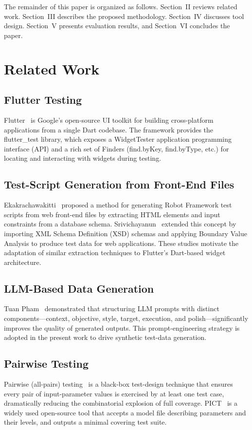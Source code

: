 \documentclass[conference]{IEEEtran}
\renewcommand{\texttt}[1]{\textnormal{#1}}
\begin{document}
The remainder of this paper is organized as follows. Section~II reviews
related work. Section~III describes the proposed methodology. Section~IV
discusses tool design. Section~V presents evaluation results, and
Section~VI concludes the paper.

\section{Related Work}

\subsection{Flutter Testing}
Flutter~\cite{b1} is Google's open-source UI toolkit for building
cross-platform applications from a single Dart codebase. The framework
provides the \texttt{flutter\_test} library, which exposes a
\texttt{WidgetTester} application programming interface (API) and a rich set of Finders (\texttt{find.byKey},
\texttt{find.byType}, etc.) for locating and interacting with widgets during
testing.

\subsection{Test-Script Generation from Front-End Files}
Ekakrachawakitti~\cite{b2} proposed a method for generating Robot Framework test
scripts from web front-end files by extracting HTML elements and input
constraints from a database schema. Srivichayanun~\cite{b3} extended this concept
by importing XML Schema Definition (XSD) schemas and applying Boundary Value Analysis to produce test
data for web applications. These studies motivate the adaptation of similar extraction
techniques to Flutter's Dart-based widget architecture.

\subsection{LLM-Based Data Generation}
Tuan Pham~\cite{b4} demonstrated that structuring LLM prompts with distinct
components---context, objective, style, target, execution, and
polish---significantly improves the quality of generated outputs. This
prompt-engineering strategy is adopted in the present work to drive synthetic
test-data generation.

\subsection{Pairwise Testing}
Pairwise (all-pairs) testing~\cite{b7} is a black-box test-design technique
that ensures every pair of input-parameter values is exercised by at least one
test case, dramatically reducing the combinatorial explosion of full coverage.
PICT~\cite{b8} is a widely used
open-source tool that accepts a model file describing parameters and their
levels, and outputs a minimal covering test suite.
\end{document}
